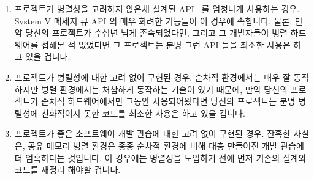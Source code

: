 {\begin{enumerate}
	\item	프로젝트가 병렬성을 고려하지 않은채 설계된
		API~\cite{HagitAttiya2011LawsOfOrder,Clements:2013:SCR:2517349.2522712}
		를 엄청나게 사용하는 경우.
		System V 메세지 큐 API 의 매우 화려한 기능들이 이 경우에
		속합니다.
		물론, 만약 당신의 프로젝트가 수십년 넘게 존속되었다면, 그리고
		그 개발자들이 병렬 하드웨어를 접해본 적 없었다면 그 프로젝트는
		분명 그런 API 들을 최소한 사용은 하고 있을 겁니다.

	\item	프로젝트가 병렬성에 대한 고려 없이 구현된 경우.
		순차적 환경에서는 매우 잘 동작하지만 병렬 환경에서는 처참하게
		동작하는 기술이 있기 때문에, 만약 당신의 프로젝트가 순차적
		하드웨어에서만 그동안 사용되어왔다면 당신의 프로젝트는 분명
		병렬성에 친화적이지 못한 코드를 최소한 사용은 하고 있을 겁니다.

	\item	프로젝트가 좋은 소프트웨어 개발 관습에 대한 고려 없이 구현된
		경우.
		잔혹한 사실은, 공유 메모리 병렬 환경은 종종 순차적 환경에 비해
		대충 만들어진 개발 관습에 더 엄혹하다는 것입니다.
		이 경우에는 병렬성을 도입하기 전에 먼저 기존의 설계와 코드를
		재정리 해야할 겁니다.

\end{enumerate}}
